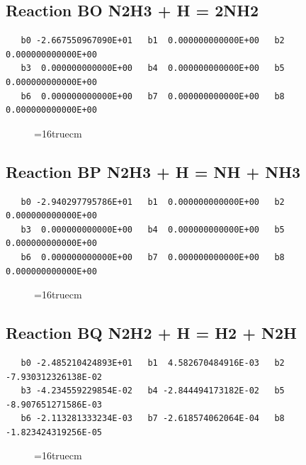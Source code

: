 \documentclass[12pt,dvipdfm]{article}
\begin{document}
\subsection{
Reaction BO N2H3 + H = 2NH2 }
\begin{small}\begin{verbatim}
   b0 -2.667550967090E+01   b1  0.000000000000E+00   b2  0.000000000000E+00
   b3  0.000000000000E+00   b4  0.000000000000E+00   b5  0.000000000000E+00
   b6  0.000000000000E+00   b7  0.000000000000E+00   b8  0.000000000000E+00
\end{verbatim}\end{small}
\begin{figure}[h!] \label{n2rates}
\epsfxsize=16truecm
\end{figure}
\newpage

\subsection{
Reaction BP N2H3 + H = NH + NH3 }
\begin{small}\begin{verbatim}
   b0 -2.940297795786E+01   b1  0.000000000000E+00   b2  0.000000000000E+00
   b3  0.000000000000E+00   b4  0.000000000000E+00   b5  0.000000000000E+00
   b6  0.000000000000E+00   b7  0.000000000000E+00   b8  0.000000000000E+00
\end{verbatim}\end{small}
\begin{figure}[h!] \label{n2rates}
\epsfxsize=16truecm
\end{figure}
\newpage

\subsection{
Reaction BQ N2H2 + H = H2 + N2H }
\begin{small}\begin{verbatim}
   b0 -2.485210424893E+01   b1  4.582670484916E-03   b2 -7.930312326138E-02
   b3 -4.234559229854E-02   b4 -2.844494173182E-02   b5 -8.907651271586E-03
   b6 -2.113281333234E-03   b7 -2.618574062064E-04   b8 -1.823424319256E-05
\end{verbatim}\end{small}
\begin{figure}[h!] \label{n2rates}
\epsfxsize=16truecm
\end{figure}
\newpage
\end{document}
